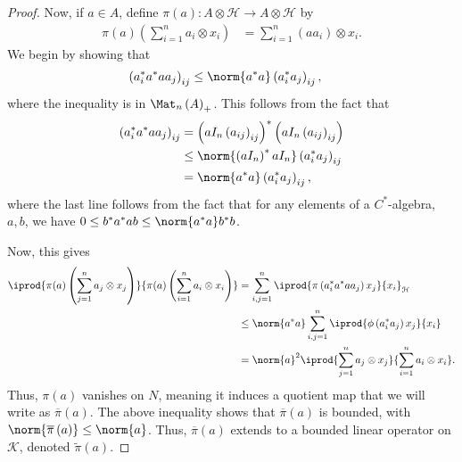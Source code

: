 \documentclass[10pt]{mypackage}
\begin{document}
\begin{proof}
  Now, if $a\in A$, define $\pi(a)\colon A\otimes \mathcal{H}\rightarrow A\otimes \mathcal{H}$ by
  \begin{align*}
    \pi(a)\left( \sum_{i=1}^{n}a_i\otimes x_i \right) &= \sum_{i=1}^{n}\left( aa_i \right)\otimes x_i.
  \end{align*}
  We begin by showing that
  \begin{align*}
    \left( a_i^{\ast}a^{\ast}a a_j \right)_{ij} &\leq \norm{a^{\ast}a}\left( a_i^{\ast}a_j \right)_{ij},
  \end{align*}
  where the inequality is in $\Mat_n\left( A \right)_{+}$. This follows from the fact that
  \begin{align*}
    \left( a_i^{\ast}a^{\ast}a a_j \right)_{ij} &= \left( aI_n\left( a_{ij} \right)_{ij} \right)^{\ast}\left( aI_n\left( a_{ij} \right)_{ij} \right)\\
                                                &\leq \norm{\left( aI_n \right)^{\ast}aI_n} \left( a_i^{\ast}a_j \right)_{ij}\\
                                                &= \norm{a^{\ast}a} \left( a_{i}^{\ast}a_j \right)_{ij},
  \end{align*}
  where the last line follows from the fact that for any elements of a $C^{\ast}$-algebra, $a,b$, we have $0\leq b^{\ast}a^{\ast}ab\leq \norm{a^{\ast}a}b^{\ast}b$.\newline

  Now, this gives
  \begin{align*}
    \iprod{\pi(a)\left( \sum_{j=1}^{n}a_j\otimes x_j \right)}{\pi(a)\left( \sum_{i=1}^{n}a_i\otimes x_i \right)} &= \sum_{i,j=1}^{n} \iprod{\pi\left( a_i^{\ast}a^{\ast}aa_j \right)x_j}{x_i}_{\mathcal{H}}\\
                                                                                                                 &\leq \norm{a^{\ast}a}\sum_{i,j=1}^{n} \iprod{\phi\left( a_i^{\ast}a_j \right)x_j}{x_i}\\
                                                                                                                 &= \norm{a}^2 \iprod{\sum_{j=1}^{n}a_j\otimes x_j}{\sum_{i=1}^{n}a_i\otimes x_i}.
  \end{align*}
  Thus, $\pi(a)$ vanishes on $N$, meaning it induces a quotient map that we will write as $\overline{\pi}(a)$. The above inequality shows that $\overline{\pi}(a)$ is bounded, with $\norm{\overline{\pi}\left( a \right)}\leq \norm{a}$. Thus, $\overline{\pi}\left( a \right)$ extends to a bounded linear operator on $\mathcal{K}$, denoted $\widetilde{\pi}\left( a \right)$.\newline


\end{proof}
\end{document}
